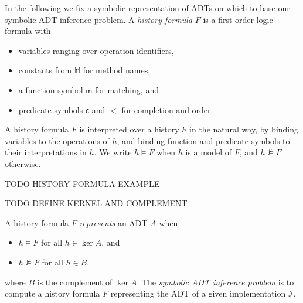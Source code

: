 In the following we fix a symbolic representation of ADTs on which to base our
symbolic ADT inference problem. A \emph{history formula} $F$ is a first-order
logic formula with
\begin{itemize}

  \item variables ranging over operation identifiers,

  \item constants from $\mathbb{M}$ for method names,

  \item a function symbol $\mathsf{m}$ for matching, and

  \item predicate symbols $\mathsf{c}$ and $\mathsf{<}$ for completion and
  order.

\end{itemize}
A history formula $F$ is interpreted over a history $h$ in the natural way, by
binding variables to the operations of $h$, and binding function and predicate
symbols to their interpretations in $h$. We write $h \models F$ when $h$ is a
model of $F$, and $h \not\models F$ otherwise.

\begin{example}

  TODO HISTORY FORMULA EXAMPLE

\end{example}

TODO DEFINE KERNEL AND COMPLEMENT

A history formula $F$ \emph{represents} an ADT $A$ when:
\begin{itemize}

  \item $h \models F$ for all $h \in \ker A$, and

  \item $h \not\models F$ for all $h \in B$,

\end{itemize}
where $B$ is the complement of $\ker A$. The \emph{symbolic ADT inference
problem} is to compute a history formula $F$ representing the ADT of a given
implementation $\mathcal{I}$.

